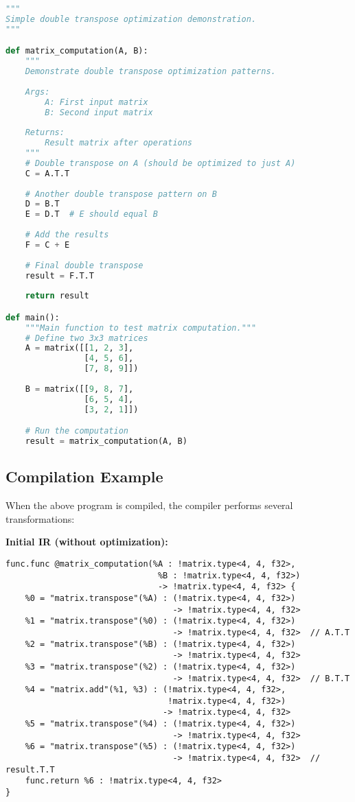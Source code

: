 \documentclass[11pt,a4paper]{article}
\begin{document}
\begin{lstlisting}[language=Python, caption=main\_input.mx - Example Input Program]
"""
Simple double transpose optimization demonstration.
"""

def matrix_computation(A, B):
    """
    Demonstrate double transpose optimization patterns.
    
    Args:
        A: First input matrix
        B: Second input matrix
    
    Returns:
        Result matrix after operations
    """
    # Double transpose on A (should be optimized to just A)
    C = A.T.T
    
    # Another double transpose pattern on B
    D = B.T
    E = D.T  # E should equal B
    
    # Add the results
    F = C + E
    
    # Final double transpose
    result = F.T.T
    
    return result

def main():
    """Main function to test matrix computation."""
    # Define two 3x3 matrices
    A = matrix([[1, 2, 3],
                [4, 5, 6],
                [7, 8, 9]])
    
    B = matrix([[9, 8, 7],
                [6, 5, 4],
                [3, 2, 1]])

    # Run the computation
    result = matrix_computation(A, B)

\end{lstlisting}

\subsection{Compilation Example}

When the above program is compiled, the compiler performs several transformations:

\textbf{Initial IR (without optimization):}
\begin{lstlisting}[caption=Unoptimized IR with Double Transposes]
func.func @matrix_computation(%A : !matrix.type<4, 4, f32>, 
                               %B : !matrix.type<4, 4, f32>) 
                               -> !matrix.type<4, 4, f32> {
    %0 = "matrix.transpose"(%A) : (!matrix.type<4, 4, f32>) 
                                  -> !matrix.type<4, 4, f32>
    %1 = "matrix.transpose"(%0) : (!matrix.type<4, 4, f32>) 
                                  -> !matrix.type<4, 4, f32>  // A.T.T
    %2 = "matrix.transpose"(%B) : (!matrix.type<4, 4, f32>) 
                                  -> !matrix.type<4, 4, f32>
    %3 = "matrix.transpose"(%2) : (!matrix.type<4, 4, f32>) 
                                  -> !matrix.type<4, 4, f32>  // B.T.T
    %4 = "matrix.add"(%1, %3) : (!matrix.type<4, 4, f32>, 
                                 !matrix.type<4, 4, f32>) 
                                -> !matrix.type<4, 4, f32>
    %5 = "matrix.transpose"(%4) : (!matrix.type<4, 4, f32>) 
                                  -> !matrix.type<4, 4, f32>
    %6 = "matrix.transpose"(%5) : (!matrix.type<4, 4, f32>) 
                                  -> !matrix.type<4, 4, f32>  // result.T.T
    func.return %6 : !matrix.type<4, 4, f32>
}
\end{lstlisting}
\end{document}
